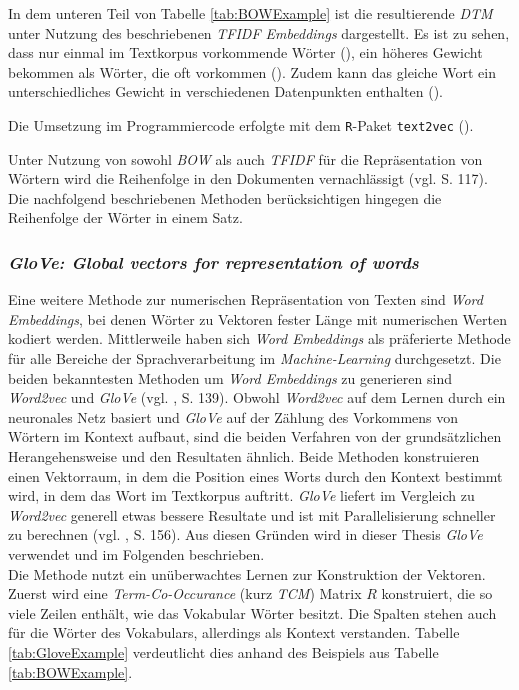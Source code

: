 \documentclass[a4paper,11pt]{article}
\begin{document}
In dem unteren Teil von Tabelle \ref{tab:BOWExample} ist die resultierende \textit{DTM} unter Nutzung des beschriebenen \textit{TFIDF Embeddings} dargestellt. Es ist zu sehen, dass nur einmal im Textkorpus vorkommende Wörter (), ein höheres Gewicht bekommen als Wörter, die oft vorkommen (). Zudem kann das gleiche Wort ein unterschiedliches Gewicht in verschiedenen Datenpunkten enthalten ().

Die Umsetzung im Programmiercode erfolgte mit dem \texttt{R}-Paket \texttt{text2vec} (\cite{text2vec}).

Unter Nutzung von sowohl \textit{BOW} als auch \textit{TFIDF} für die Repräsentation von Wörtern wird die Reihenfolge in den Dokumenten vernachlässigt (vgl. \cite{deepEssentials} S. 117). 
Die nachfolgend beschriebenen Methoden berücksichtigen hingegen die Reihenfolge der Wörter in einem Satz.


\subsubsection{\textit{GloVe: Global vectors for representation of words}} \label{Kap:Glove}

Eine weitere Methode zur numerischen Repräsentation von Texten sind \textit{Word Embeddings}, bei denen Wörter zu Vektoren fester Länge mit numerischen Werten kodiert werden. Mittlerweile haben sich \textit{Word Embeddings} als präferierte Methode für alle Bereiche der Sprachverarbeitung im \textit{Machine-Learning} durchgesetzt. Die beiden bekanntesten Methoden um \textit{Word Embeddings} zu generieren sind \textit{Word2vec} und \textit{GloVe} (vgl. \cite{keras}, S. 139). Obwohl \textit{Word2vec} auf dem Lernen durch ein neuronales Netz basiert und \textit{GloVe} auf der Zählung des Vorkommens von Wörtern im Kontext aufbaut, sind die beiden Verfahren von der grundsätzlichen Herangehensweise und den Resultaten ähnlich. Beide Methoden konstruieren einen Vektorraum, in dem die Position eines Worts durch den Kontext bestimmt wird, in dem das Wort im Textkorpus auftritt.
\textit{GloVe} liefert im Vergleich zu \textit{Word2vec} generell etwas bessere Resultate und ist mit Parallelisierung schneller zu berechnen (vgl. \cite{keras}, S. 156). Aus diesen Gründen wird in dieser Thesis \textit{GloVe} verwendet und im Folgenden beschrieben. \\
Die Methode nutzt ein unüberwachtes Lernen zur Konstruktion der Vektoren. Zuerst wird eine \textit{Term-Co-Occurance} (kurz \textit{TCM}) Matrix $R$ konstruiert, die so viele Zeilen enthält, wie das Vokabular Wörter besitzt. Die Spalten stehen auch für die Wörter des Vokabulars, allerdings als Kontext verstanden. Tabelle \ref{tab:GloveExample} verdeutlicht dies anhand des Beispiels aus Tabelle \ref{tab:BOWExample}.
\end{document}
